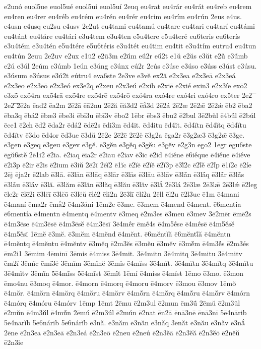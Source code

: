 {e2unó
euol5ue
euol5ué
euol5ui
euol5uí
2euq
eu4rat
eu4rár
eu4rát
eu4reb
eu4rem
eu4ren
eu4rer
eu4réb
eu4rém
eu4rén
eu4rér
eu4rim
eu4rím
eu4rún
2eus
e4us.
e4usn
e4usq
eu2su
e4usv
2e2ut
eu4tami
eu4tamú
eu4tare
eu4tari
eu4tarí
eu4támi
eu4tánt
eu4táre
eu4tári
e3u4tem
e3u4ten
e5u4tere
e5u4teré
eu6teris
eu6terís
e3u4tém
e3u4tén
e5u4tére
e5u6téris
e3u4tét
eu4tim
eu4tit
e3u4tím
eutru4
eu4tun
eu4tún
2euu
2e2uv
e2ux
e1ū2
e2ū3m
e2ū́m
eū́2r
eū́2t
e1ŭ
e2ŭs
e3ŭt
e2ŭ́
e3ŭ́mb
e2ú
e3úl
2eúm
e3úmb
1eún
e3úng
e3únx
eú2r
2eús
e3úse
e3úso
e3úss
e3úst
e3úsu.
e3úsum
e3úsus
e3ú2t
eútru4
eva6ste
2e3ve
e3vĕ
ex2ă
e2x3ea
e2x3eā
e2x3eá
e2x3eo
e2x3eō
e2x3eó
ex3e2q
e2xeu
e2x3eú
e2xib
e2xiē
e2xié
exin3
e2x3íe
exō2
e3xṓ
exṓ4ra
exṓ4rā
exṓ4re
exṓ4rē
exṓ4rō
exó4ra
exó4re
exó4ri
exó4ro
ex5ter
2e2͞
2e2͡
2ē2a
ēad2
ēa2m
2ē2ā
ēā2nu
2ē2ă
ēă3d2
ēắ3d
2ē2á
2ē2æ
2ē2ǣ
2ē2ǽ
ēb2
ēba2
ēba3q
ēbá2
ēbæ3
ēbe3i
ēbī3u
ēbī3v
ēbo2
1ēbr
ēbs3
ēbu2
ē2bul
3ē2bŭl
ē4bŭ́l
ē2búl
ēce1
ē2ch
ēd2
ēda2r
ēdá2
ēdē2s
ēdi3m
ēd4it.
ēd4itu
ēd4ĭt.
ēd4ĭtn
ēd4ĭtq
ēd4ĭtu
ēd4ĭtv
ē3do
ēd4or
ēd3ue
ē3dŭ
2ē2e
2ē2ē
2ē2ĕ
ē3g2a
ēga2r
ē3g2æ3
ē3g2ǣ
ē3ge.
ē3gen
ē3geq
ē3geu
ē3gev
ē3gĕ.
ē3gĕn
ē3gĕq
ē3gĕu
ē3gĕv
ē2g3n
ēgo2
1ēgr
ēgu6ste
ēgŭ6stĕ
2ē1i2
ē2ia.
ē2iaq
ēia2r
ē2iau
ē2iav
ē3ic
ē2id
ē4iḗne
ē6iḗque
ē4iḗue
ē4iḗve
ē2i3p
ē2ir
ē2is
ē2ium
ē3iŭ
2ē2ī
2ēĭ2
ē1ĭc
ē2ĭē
ē2ĭĕ
ē2ĭ3p
ē3ĭ́2c
ē2ĭ́ĕ
ē2ĭ́p
ē1í2c
ē2íe
2ēj
ēja2r
ē2lab
ē3lā.
ē3lān
ē3lāq
ē3lār
ē3lās
ē3lāu
ē3lāv
ē3lā́n
ē3lā́q
ē3lā́r
ē3lā́s
ē3lā́u
ē3lā́v
ē3lă.
ē3lăm
ē3lăn
ē3lăq
ē3lău
ē3lăv
ē3lắ
2ē3lá
2ē3læ
2ē3lǣ
2ē3lǽ
ē2leg
ēle2r
ēlē2i
ē3lĕī
ē3lĕō
ē3lĕŭ
ēlé2
ēli2n
2ē3lī
ēlí2n
2ēll
ēl2u
ē2l3ue
ē1m
ē4mani
ē4maní
ēma2r
ēmắ2
ē4m3áni
1ēm2e
ē3me.
ē3mem
ē4mend
ē4ment.
ē6mentia
ē6mentía
ē4mentn
ē4mentq
ē4mentv
ē3meq
ē2m3es
ē3meu
ē3mev
3ē2mēr
ēmē2s
ē4m3ēse
ē4m3ēsē
ē4m3ēsĕ
ē4m3ēsī
3ē4mḗr
ēmḗ4s
ē4m5ḗse
ē4mḗsē
ē4m5ḗsĕ
ē4m5ḗsī
1ēmĕ
ē3mĕ.
ē3mĕm
ē4mĕnd
ē4mĕnt.
ē6mĕntĭă
ē6mĕntĭ́ă
ē4mĕntn
ē4mĕntq
ē4mĕntu
ē4mĕntv
ē3mĕq
ē2m3ĕs
ē3mĕu
ē3mĕv
ē3mĕ́m
ē4m3ĕ́s
ē2m3és
ēm2i1
3ēmim
4ēminī
3ēmis
ē4miss
3ē4mit.
3ē4mitn
3ē4mitq
3ē4mitu
3ē4mitv
ēm2ĭ
3ēmĭc
ēmĭ3ĕ
3ēmĭm
3ēmĭnĕ
3ēmĭs
ē4mĭss
3ē4mĭt.
3ē4mĭtn
3ē4mĭtq
3ē4mĭtu
3ē4mĭtv
3ēmĭ́n
5ē4mĭ́ss
5ē4mĭ́st
3ēmĭ́t
1ēmí
ē4míss
ē4míst
1ēmo
ē3mo.
ē3mon
ēmo4nu
ē3moq
ē4mor.
ē4morn
ē4morq
ē4moru
ē4morv
ē3mou
ē3mov
1ēmŏ
ē4mŏr.
ē4mŏrn
ē4mŏrq
ē4mŏru
ē4mŏrv
ē4mŏ́rn
ē4mŏ́rq
ē4mŏ́ru
ē4mŏ́rv
ē4mórn
ē4mórq
ē4móru
ē4mórv
1ēmp
1ēmt
2ēmu
ē2m3ul
ē2mun
ēm3ū́
2ēmŭ
ē2m3ŭl
ē2mŭn
ē4m3ŭ́l
ē4mŭ́n
2ēmú
ē2m3úl
ē2mún
ē2nat
ēn2ā
ēnā3nē
ēnā3nī
5ē4nārib
5ē4nārĭb
5ē6nā́rib
5ē6nā́rĭb
ē3nă.
ē3năm
ē3năn
ē3năq
3ēnăt
ē3nău
ē3năv
ē3nắ
2ēne
ē2n3ea
ē2n3eā
ē2n3eá
ē2n3eō
ē2neu
ē2neú
ē2n3ĕā
ē2n3ĕă
ē2n3ĕō
ē2nĕŭ
ē2n3ie
}
